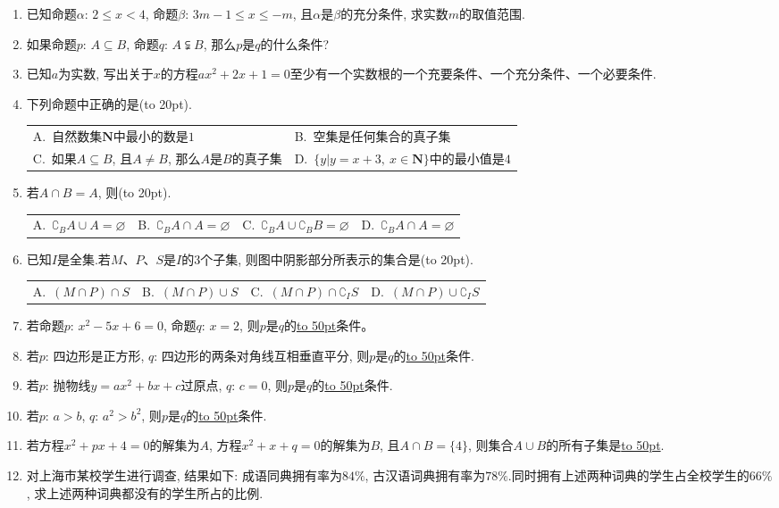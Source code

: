 \documentclass[10pt,a4paper]{article}
\newcommand{\blank}[1]{\underline{\hbox to #1pt{}}}
\newcommand{\bracket}[1]{(\hbox to #1pt{})}
\newcommand{\twoch}[4]{\par\begin{tabular}{p{.46\textwidth}p{.46\textwidth}}
A.~#1& B.~#2\\
C.~#3& D.~#4
\end{tabular}}
\newcommand{\fourch}[4]{\par\begin{tabular}{p{.23\textwidth}p{.23\textwidth}p{.23\textwidth}p{.23\textwidth}}
A.~#1 &B.~#2& C.~#3& D.~#4
\end{tabular}}
\begin{document}
\begin{enumerate}[1.]
\item 已知命题$\alpha$: $2\le x<4$, 命题$\beta$: $3m-1\le x\le -m$, 且$\alpha$是$\beta$的充分条件, 求实数$m$的取值范围.
\item 如果命题$p$: $A\subseteq B$, 命题$q$: $A\subsetneqq B$, 那么$p$是$q$的什么条件?
\item 已知$a$为实数, 写出关于$x$的方程$ax^2+2x+1=0$至少有一个实数根的一个充要条件、一个充分条件、一个必要条件.
\item 下列命题中正确的是\bracket{20}.
\twoch{自然数集$\mathbf{N}$中最小的数是$1$}{空集是任何集合的真子集}{如果$A\subseteq B$, 且$A\ne B$, 那么$A$是$B$的真子集}{$\{y|y=x+3,\ x\in \mathbf{N}\}$中的最小值是$4$}
\item 若$A\cap B=A$, 则\bracket{20}.
\fourch{$\complement _BA\cup A=\varnothing$}{$\complement _BA\cap A=\varnothing$}{$\complement _BA\cup \complement _BB=\varnothing$}{$\complement _BA\cap A=\varnothing$}
\item 已知$I$是全集.若$M$、$P$、$S$是$I$的$3$个子集, 则图中阴影部分所表示的集合是\bracket{20}.
\begin{center}
\end{center}
\fourch{$(M\cap P)\cap S$}{$(M\cap P)\cup S$}{$(M\cap P)\cap \complement _IS$}{$(M\cap P)\cup \complement _IS$}
\item 若命题$p$: $x^2-5x+6=0$, 命题$q$: $x=2$, 则$p$是$q$的\blank{50}条件。
\item 若$p$: 四边形是正方形, $q$: 四边形的两条对角线互相垂直平分, 则$p$是$q$的\blank{50}条件.
\item 若$p$: 抛物线$y=ax^2+bx+c$过原点, $q$: $c=0$, 则$p$是$q$的\blank{50}条件.
\item 若$p$: $a>b$, $q$: $a^2>b^2$, 则$p$是$q$的\blank{50}条件.
\item 若方程$x^2+px+4=0$的解集为$A$, 方程$x^2+x+q=0$的解集为$B$, 且$A\cap B=\{4\}$, 则集合$A\cup B$的所有子集是\blank{50}.
\item 对上海市某校学生进行调查, 结果如下: 成语同典拥有率为$84\%$, 古汉语词典拥有率为$78\%$.同时拥有上述两种词典的学生占全校学生的$66\%$, 求上述两种词典都没有的学生所占的比例.

\end{enumerate}
\end{document}
